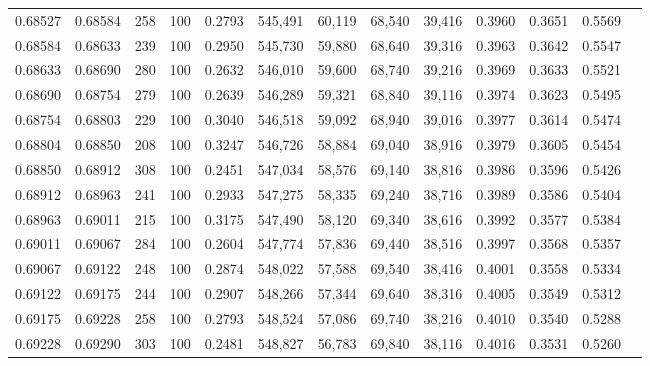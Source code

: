 \begin{tabular}{rrrrrrrrrrrrr}
0.68527 & 0.68584 &   258 & 100 &                                     0.2793 & 545,491 &  60,119 &  68,540 &  39,416 & 0.3960 & 0.3651 & 0.5569 \\
0.68584 & 0.68633 &   239 & 100 &                                     0.2950 & 545,730 &  59,880 &  68,640 &  39,316 & 0.3963 & 0.3642 & 0.5547 \\
0.68633 & 0.68690 &   280 & 100 &                                     0.2632 & 546,010 &  59,600 &  68,740 &  39,216 & 0.3969 & 0.3633 & 0.5521 \\
0.68690 & 0.68754 &   279 & 100 &                                     0.2639 & 546,289 &  59,321 &  68,840 &  39,116 & 0.3974 & 0.3623 & 0.5495 \\
0.68754 & 0.68803 &   229 & 100 &                                     0.3040 & 546,518 &  59,092 &  68,940 &  39,016 & 0.3977 & 0.3614 & 0.5474 \\
0.68804 & 0.68850 &   208 & 100 &                                     0.3247 & 546,726 &  58,884 &  69,040 &  38,916 & 0.3979 & 0.3605 & 0.5454 \\
0.68850 & 0.68912 &   308 & 100 &                                     0.2451 & 547,034 &  58,576 &  69,140 &  38,816 & 0.3986 & 0.3596 & 0.5426 \\
0.68912 & 0.68963 &   241 & 100 &                                     0.2933 & 547,275 &  58,335 &  69,240 &  38,716 & 0.3989 & 0.3586 & 0.5404 \\
0.68963 & 0.69011 &   215 & 100 &                                     0.3175 & 547,490 &  58,120 &  69,340 &  38,616 & 0.3992 & 0.3577 & 0.5384 \\
0.69011 & 0.69067 &   284 & 100 &                                     0.2604 & 547,774 &  57,836 &  69,440 &  38,516 & 0.3997 & 0.3568 & 0.5357 \\
0.69067 & 0.69122 &   248 & 100 &                                     0.2874 & 548,022 &  57,588 &  69,540 &  38,416 & 0.4001 & 0.3558 & 0.5334 \\
0.69122 & 0.69175 &   244 & 100 &                                     0.2907 & 548,266 &  57,344 &  69,640 &  38,316 & 0.4005 & 0.3549 & 0.5312 \\
0.69175 & 0.69228 &   258 & 100 &                                     0.2793 & 548,524 &  57,086 &  69,740 &  38,216 & 0.4010 & 0.3540 & 0.5288 \\
0.69228 & 0.69290 &   303 & 100 &                                     0.2481 & 548,827 &  56,783 &  69,840 &  38,116 & 0.4016 & 0.3531 & 0.5260 \\

\end{tabular}
